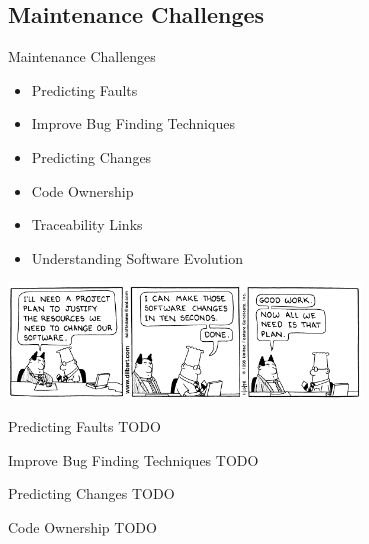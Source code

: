 \note{
}

\subsection{Maintenance Challenges}

\begin{frame}{Maintenance Challenges}
  \begin{itemize}
  \item Predicting Faults
  \item Improve Bug Finding Techniques
  \item Predicting Changes
  \item Code Ownership
  \item Traceability Links
  \item Understanding Software Evolution
  \end{itemize}


  \begin{center}
    \includegraphics[width=0.7\textwidth]{figures/dilbert-software-changes}
  \end{center}
\end{frame}

\note{
}

\begin{frame}{Predicting Faults}
  TODO
\end{frame}

\note{
}

\begin{frame}{Improve Bug Finding Techniques}
  TODO
\end{frame}

\note{
}

\begin{frame}{Predicting Changes}
  TODO
\end{frame}

\note{
}

\begin{frame}{Code Ownership}
  TODO
\end{frame}

\note{
}

